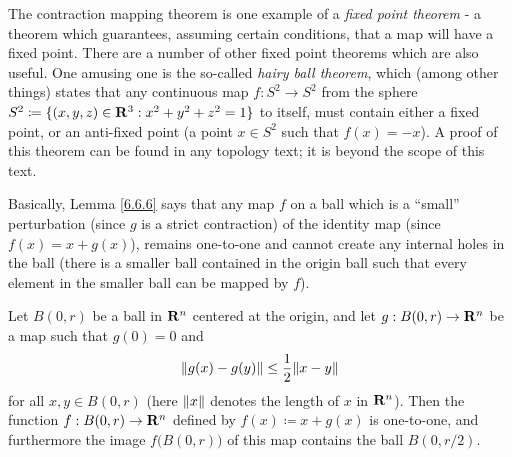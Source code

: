 \begin{remark}\label{6.6.5}
    The contraction mapping theorem is one example of a \emph{fixed point theorem}
    - a theorem which guarantees, assuming certain conditions, that a map will have a fixed point.
    There are a number of other fixed point theorems which are also useful.
    One amusing one is the so-called \emph{hairy ball theorem}, which (among other things) states that any continuous map \(f : S^2 \to S^2\) from the sphere \(S^2 \coloneqq \{(x, y, z) \in \R^3 : x^2 + y^2 + z^2 = 1\}\) to itself, must contain either a fixed point, or an anti-fixed point
    (a point \(x \in S^2\) such that \(f(x) = -x\)).
    A proof of this theorem can be found in any topology text;
    it is beyond the scope of this text.
\end{remark}

\begin{note}
    Basically, Lemma \ref{6.6.6} says that any map \(f\) on a ball which is a ``small'' perturbation (since \(g\) is a strict contraction) of the identity map (since \(f(x) = x + g(x)\)), remains one-to-one and cannot create any internal holes in the ball
    (there is a smaller ball contained in the origin ball such that every element in the smaller ball can be mapped by \(f\)).
\end{note}

\begin{lemma}\label{6.6.6}
    Let \(B(0, r)\) be a ball in \(\R^n\) centered at the origin, and let \(g : B(0, r) \to \R^n\) be a map such that \(g(0) = 0\) and
    \[
        \norm*{g(x) - g(y)} \leq \frac{1}{2} \norm*{x - y}
    \]
    for all \(x, y \in B(0, r)\)
    (here \(\norm*{x}\) denotes the length of \(x\) in \(\R^n\)).
    Then the function \(f : B(0, r) \to \R^n\) defined by \(f(x) \coloneqq x + g(x)\) is one-to-one, and furthermore the image \(f\big(B(0, r)\big)\) of this map contains the ball \(B(0, r / 2)\).
\end{lemma}

